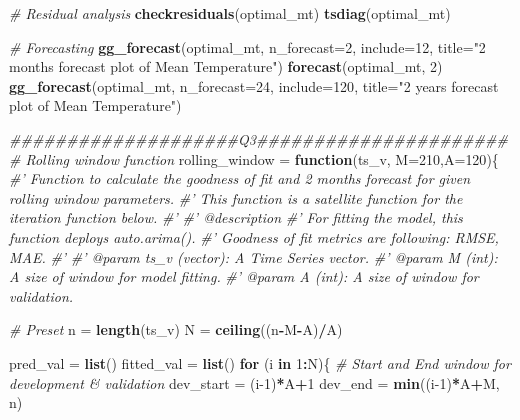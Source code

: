 \documentclass[
  11pt,
]{article}
\newenvironment{Shaded}{\begin{snugshade}}{\end{snugshade}}
\newcommand{\CommentTok}[1]{\textcolor[rgb]{0.56,0.35,0.01}{\textit{#1}}}
\newcommand{\ControlFlowTok}[1]{\textcolor[rgb]{0.13,0.29,0.53}{\textbf{#1}}}
\newcommand{\DataTypeTok}[1]{\textcolor[rgb]{0.13,0.29,0.53}{#1}}
\newcommand{\DecValTok}[1]{\textcolor[rgb]{0.00,0.00,0.81}{#1}}
\newcommand{\KeywordTok}[1]{\textcolor[rgb]{0.13,0.29,0.53}{\textbf{#1}}}
\newcommand{\NormalTok}[1]{#1}
\newcommand{\OperatorTok}[1]{\textcolor[rgb]{0.81,0.36,0.00}{\textbf{#1}}}
\newcommand{\StringTok}[1]{\textcolor[rgb]{0.31,0.60,0.02}{#1}}
\begin{document}
\begin{Shaded}
\begin{Highlighting}[]
{{{\CommentTok{# Residual analysis}
\KeywordTok{checkresiduals}\NormalTok{(optimal_mt)}
\KeywordTok{tsdiag}\NormalTok{(optimal_mt)}

\CommentTok{# Forecasting}
\KeywordTok{gg_forecast}\NormalTok{(optimal_mt, }\DataTypeTok{n_forecast=}\DecValTok{2}\NormalTok{, }\DataTypeTok{include=}\DecValTok{12}\NormalTok{, }\DataTypeTok{title=}\StringTok{"2 months forecast plot of Mean Temperature"}\NormalTok{)}
\KeywordTok{forecast}\NormalTok{(optimal_mt, }\DecValTok{2}\NormalTok{)}
\KeywordTok{gg_forecast}\NormalTok{(optimal_mt, }\DataTypeTok{n_forecast=}\DecValTok{24}\NormalTok{, }\DataTypeTok{include=}\DecValTok{120}\NormalTok{, }\DataTypeTok{title=}\StringTok{"2 years forecast plot of Mean Temperature"}\NormalTok{)}

\CommentTok{####################Q3######################}
\CommentTok{# Rolling window function}
\NormalTok{rolling_window =}\StringTok{ }\ControlFlowTok{function}\NormalTok{(ts_v, }\DataTypeTok{M=}\DecValTok{210}\NormalTok{,}\DataTypeTok{A=}\DecValTok{120}\NormalTok{)\{}
  \CommentTok{#' Function to calculate the goodness of fit and 2 months forecast for given rolling window parameters.}
  \CommentTok{#' This function is a satellite function for the iteration function below.}
  \CommentTok{#' }
  \CommentTok{#' @description}
  \CommentTok{#' For fitting the model, this function deploys auto.arima().}
  \CommentTok{#' Goodness of fit metrics are following: RMSE, MAE.}
  \CommentTok{#'}
  \CommentTok{#' @param ts_v (vector): A Time Series vector.}
  \CommentTok{#' @param M (int): A size of window for model fitting.}
  \CommentTok{#' @param A (int): A size of window for validation.}
  
  \CommentTok{# Preset}
\NormalTok{  n =}\StringTok{ }\KeywordTok{length}\NormalTok{(ts_v)}
\NormalTok{  N =}\StringTok{ }\KeywordTok{ceiling}\NormalTok{((n}\OperatorTok{-}\NormalTok{M}\OperatorTok{-}\NormalTok{A)}\OperatorTok{/}\NormalTok{A)}
  
\NormalTok{  pred_val =}\StringTok{ }\KeywordTok{list}\NormalTok{()}
\NormalTok{  fitted_val =}\StringTok{ }\KeywordTok{list}\NormalTok{()}
  \ControlFlowTok{for}\NormalTok{ (i }\ControlFlowTok{in} \DecValTok{1}\OperatorTok{:}\NormalTok{N)\{}
    \CommentTok{# Start and End window for development & validation}
\NormalTok{    dev_start =}\StringTok{ }\NormalTok{(i}\DecValTok{-1}\NormalTok{)}\OperatorTok{*}\NormalTok{A}\OperatorTok{+}\DecValTok{1}
\NormalTok{    dev_end =}\StringTok{ }\KeywordTok{min}\NormalTok{((i}\DecValTok{-1}\NormalTok{)}\OperatorTok{*}\NormalTok{A}\OperatorTok{+}\NormalTok{M, n)}
    
}}}
\end{Highlighting}
\end{Shaded}
\end{document}
